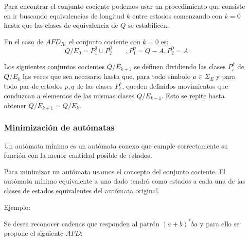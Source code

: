 \documentclass[12pt]{article}
\begin{document}
Para encontrar el conjunto cociente podemos usar un procedimiento que consiste en ir buscando equivalencias de longitud $ k $ entre estados comenzando con $ k=0 $ hasta que las clases de equivalencia de $ Q $ se estabilicen.

En el caso de $ AFD_{R} $, el conjunto cociente con $ k=0 $ es:
\[
Q/E_{0} = P_{1}^{0} \cup P_{2}^{0}\qquad ,P_{1}^{0} = Q-A, P_{2}^{0}=A
\]

Los siguientes conjuntos cocientes $ Q/E_{k+1} $ se definen dividiendo las clases $ P_{i}^{k} $ de $ Q/E_{k} $ las veces que sea necesario hasta que, para todo símbolo $ a \in \Sigma_{E} $ y para todo par de estados $ p,q $ de las clases $ P_{i}^{k} $, queden definidos movimientos que conduzcan a elementos de las mismas clases $ Q/E_{k+1} $. Esto se repite hasta obtener $ Q/E_{k+1} = Q/E_{k} $.

\subsubsection{Minimización de autómatas}
Un autómata mínimo es un autómata conexo que cumple correctamente su función con la menor cantidad posible de estados.

Para minimizar un autómata usamos el concepto del conjunto cociente. El autómata mínimo equivalente a uno dado tendrá como estados a cada una de las clases de estados equivalentes del autómata original.

Ejemplo:

Se desea reconocer cadenas que responden al patrón $ (a+b)^{*}ba $ y para ello se propone el siguiente $ AFD $:
\begin{center}
\end{center}
\end{document}
